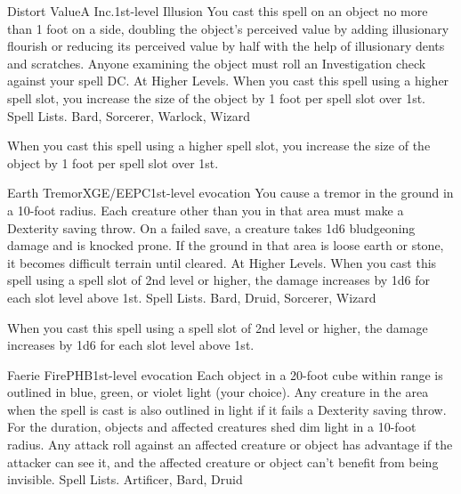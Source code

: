 \begin{spell}{Distort Value}{A Inc.}{1st-level Illusion}
{
}
You cast this spell on an object no more than 1 foot on a side, doubling the object's perceived value by adding illusionary flourish or reducing its perceived value by half with the help of illusionary dents and scratches. Anyone examining the object must roll an Investigation check against your spell DC.
At Higher Levels. When you cast this spell using a higher spell slot, you increase the size of the object by 1 foot per spell slot over 1st.
Spell Lists. Bard, Sorcerer, Warlock, Wizard

 When you cast this spell using a higher spell slot, you increase the size of the object by 1 foot per spell slot over 1st.
\end{spell}

\begin{spell}{Earth Tremor}{XGE/EEPC}{1st-level evocation}
{
}
You cause a tremor in the ground in a 10-foot radius. Each creature other than you in that area must make a Dexterity saving throw. On a failed save, a creature takes 1d6 bludgeoning damage and is knocked prone. If the ground in that area is loose earth or stone, it becomes difficult terrain until cleared.
At Higher Levels. When you cast this spell using a spell slot of 2nd level or higher, the damage increases by 1d6 for each slot level above 1st.
Spell Lists. Bard, Druid, Sorcerer, Wizard

 When you cast this spell using a spell slot of 2nd level or higher, the damage increases by 1d6 for each slot level above 1st.
\end{spell}

\begin{spell}{Faerie Fire}{PHB}{1st-level evocation}
{
}
Each object in a 20-foot cube within range is outlined in blue, green, or violet light (your choice).
Any creature in the area when the spell is cast is also outlined in light if it fails a Dexterity saving throw. For the duration, objects and affected creatures shed dim light in a 10-foot radius.
Any attack roll against an affected creature or object has advantage if the attacker can see it, and the affected creature or object can’t benefit from being invisible.
Spell Lists. Artificer, Bard, Druid
\end{spell}

